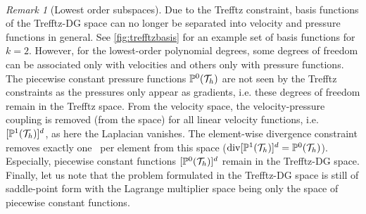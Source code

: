 \documentclass[pdflatex,sn-mathphys,Numbered]{sn-jnl}%
\theoremstyle{remark}%
\newtheorem{remark}{Remark}%
\theoremstyle{definition}%
\begin{document}
~
\begin{remark}[Lowest order subspaces]\label{rem:loworder} Due to the
  Trefftz constraint, basis functions of the Trefftz-DG space can no
  longer be separated into velocity and pressure functions in general.
  See \cref{fig:trefftzbasis} for an example set of basis functions
  for $k=2$. However, for the lowest-order polynomial degrees, some
  degrees of freedom can be associated only with velocities and others
  only with pressure functions. The piecewise constant pressure
  functions $\mathbb{P}^0({\mathcal{T}_h})$ are not seen by the Trefftz constraints as
  the pressures only appear as gradients, i.e. these degrees of
  freedom remain in the Trefftz space. From the velocity space, the
  velocity-pressure coupling is removed (from the space) for all
  linear velocity functions, i.e. $[\mathbb{P}^1({\mathcal{T}_h})]^d$, as here the
  Laplacian vanishes. The element-wise divergence constraint removes
  exactly one \dof ~per element from this space ($\operatorname{\mathrm{div}} [\mathbb{P}^1({\mathcal{T}_h})]^d
  = \mathbb{P}^0({\mathcal{T}_h})$). Especially, piecewise constant functions
  $[\mathbb{P}^0({\mathcal{T}_h})]^d$ remain in the Trefftz-DG space. Finally, let us
  note that the problem formulated in the Trefftz-DG space is still of
  saddle-point form with the Lagrange multiplier space being only the
  space of piecewise constant functions. 
\end{remark}

\end{document}
